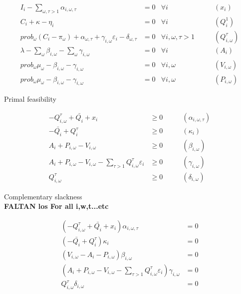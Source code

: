 \documentclass[11pt, letterpaper]{article}
\begin{document}
\begin{align}
    I_i - \sum_{\omega,\tau>1} \alpha_{i,\omega,\tau} & = 0 & \forall i  &  \qquad (x_i)\\
    C_{i} + \kappa - \eta_{i} & = 0 & \forall i  &  \qquad (Q^{1}_{i})\\
    prob_\omega (C_i-\pi_{\omega}) + \alpha_{\omega,\tau} + \gamma_{i,\omega} \varepsilon_{i}-\delta_{\omega,\tau} & =0 & \forall i, \omega, \tau>1 &  \qquad (Q_{i,\omega}^{\tau})\\
    \lambda - \sum_{\omega}\beta_{i,\omega} - \sum_{\omega}\gamma_{i,\omega} & =0 & \forall i & \qquad (A_{i}) \\
    prob_\omega \mu_{\omega} - \beta_{i,\omega}  - \gamma_{i,\omega} & =0 & \forall i, \omega & \qquad (V_{i,\omega}) \\
    prob_\omega \mu_{\omega} - \beta_{i,\omega} -\gamma_{i,\omega} & = 0 & \forall i, \omega & \qquad (P_{i,\omega})
\end{align}

\smallskip


\begin{flushleft}
Primal feasibility
\end{flushleft}

\begin{align}
    -Q_{i,\omega}^{\tau} + \bar{Q_i} + x_i & \geq 0 & \qquad (\alpha_{i,\omega,\tau}) \\
    -\bar{Q_i} + Q^{\tau}_i & \geq 0 & \qquad (\kappa_i)\\
     A_{i} + P_{i,\omega} - V_{i,\omega} & \geq 0 & \qquad (\beta_{i,\omega}) \\
     A_{i} + P_{i,\omega} - V_{i,\omega} - \sum_{\tau>1}Q_{i, \omega}^{\tau}\varepsilon_{i} & \geq 0 & \qquad (\gamma_{i,\omega}) \\
    Q_{i,\omega}^{\tau} & \geq 0 & \qquad (\delta_{i,\omega})
\end{align}

\smallskip

\begin{flushleft}
Complementary slackness\\

\textbf{FALTAN los For all i,w,t...etc}
\end{flushleft}

\begin{align}
    (-Q_{i,\omega}^{\tau} + \bar{Q_i} + x_i)\alpha_{i,\omega,\tau} & = 0 \\
    ( -\bar{Q_i} + Q^{\tau}_i)\kappa_i & = 0 \\
    (V_{i,\omega} - A_{i} - P_{i,\omega})\beta_{i,\omega} & = 0 \\
    ( A_{i} + P_{i,\omega} - V_{i,\omega} - \sum_{\tau>1}Q_{i, \omega}^{\tau}\varepsilon_{i})\gamma_{i,\omega} & = 0 \\
    Q_{i,\omega}^{\tau}\delta_{i,\omega} & = 0
\end{align}
\end{document}
